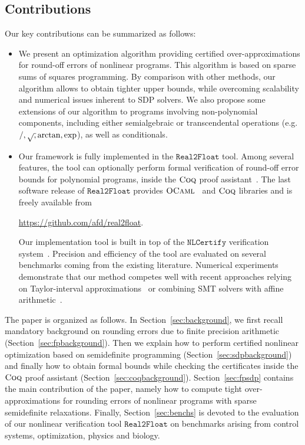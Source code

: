 \documentclass[preprint]{sigplanconf}
\newcommand{\realtofloat}{\mathtt{Real2Float}}
\newcommand{\coq}{\text{\sc Coq}}
\newcommand{\ocaml}{\text{\sc OCaml}}
\newcommand{\nlcertify}{\mathtt{NLCertify}}
\theoremstyle{plain}
\begin{document}
\subsection{Contributions}
Our key contributions can be summarized as follows:
\begin{itemize}
\item We present an optimization algorithm providing certified over-approximations for round-off errors of nonlinear programs. This algorithm is based on sparse sums of squares programming. By comparison with other methods, our algorithm allows to obtain tighter upper bounds, while overcoming scalability and numerical issues inherent to SDP solvers. We also propose some extensions of our algorithm to programs involving non-polynomial components, including either semialgebraic or transcendental operations (e.g. $/, \sqrtsign, \arctan, \exp$), as well as conditionals.
\item Our framework is fully implemented in the $\realtofloat$ tool.  Among several features, the tool can optionally perform formal verification of round-off error bounds for polynomial programs, inside the $\coq$ proof assistant~\cite{CoqProofAssistant}. The last software release of $\realtofloat$ provides $\ocaml$~\cite{OCaml} and $\coq$ libraries and is freely available from 
\begin{center}
\url{https://github.com/afd/real2float}.
\end{center}
%
Our implementation tool is built in top of the $\nlcertify$ verification system~\cite{icms14}. Precision and efficiency of the tool are evaluated on several benchmarks coming from the existing literature. Numerical experiments demonstrate that our method competes well with recent approaches relying on Taylor-interval approximations~\cite{Darulova14Popl} or combining SMT solvers with affine arithmetic~\cite{Darulova14Popl}.
\end{itemize}
%


The paper is organized as follows.
%
In Section~\ref{sec:background}, we first recall mandatory background on rounding errors due to finite precision arithmetic (Section~\ref{sec:fpbackground}). Then we explain how to perform certified nonlinear optimization based on semidefinite programming (Section~\ref{sec:sdpbackground}) and finally how to obtain formal bounds while checking the certificates inside the $\coq$ proof assistant (Section~\ref{sec:coqbackground}).
%
Section~\ref{sec:fpsdp} contains the main contribution of the paper, namely how to compute tight over-approximations for rounding errors of nonlinear programs with sparse semidefinite relaxations.
%
Finally, Section~\ref{sec:benchs} is devoted to the evaluation of our nonlinear verification tool $\realtofloat$ on benchmarks arising from control systems, optimization, physics and biology.
\end{document}
